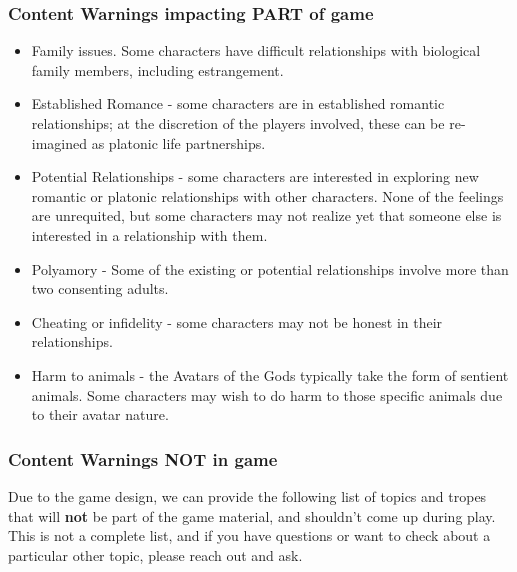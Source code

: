 \documentclass[sheet]{GL2020}
\begin{document}
\subsubsection{Content Warnings impacting PART of game}
\begin{multicols}{2}
\begin{itemize}
  	\item Family issues. Some characters have difficult relationships with biological family members, including estrangement.
	\item Established Romance - some characters are in established romantic relationships; at the discretion of the players involved, these can be re-imagined as platonic life partnerships.
	\item Potential Relationships - some characters are interested in exploring new romantic or platonic relationships with other characters. None of the feelings are unrequited, but some characters may not realize yet that someone else is interested in a relationship with them.
	\item Polyamory - Some of the existing or potential relationships involve more than two consenting adults.
	\item Cheating or infidelity - some characters may not be honest in their relationships.
	\item Harm to animals - the Avatars of the Gods typically take the form of sentient animals. Some characters may wish to do harm to those specific animals due to their avatar nature.
\end{itemize}
\end{multicols}

\subsubsection{Content Warnings NOT in game}
Due to the game design, we can provide the following list of topics and tropes that will \textbf{not} be part of the game material, and shouldn’t come up during play. This is not a complete list, and if you have questions or want to check about a particular other topic, please reach out and ask.
\end{document}
